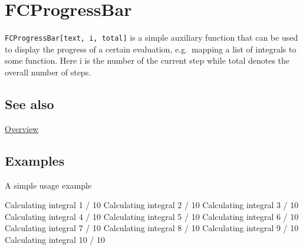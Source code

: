 \documentclass[../FeynCalcManual.tex]{subfiles}
\begin{document}
\hypertarget{fcprogressbar}{%
\section{FCProgressBar}\label{fcprogressbar}}

\texttt{FCProgressBar[\allowbreak{}text,\ \allowbreak{}i,\ \allowbreak{}total]}
is a simple auxiliary function that can be used to display the progress
of a certain evaluation, e.g.~mapping a list of integrals to some
function. Here i is the number of the current step while total denotes
the overall number of steps.

\subsection{See also}

\hyperlink{toc}{Overview}

\subsection{Examples}

A simple usage example

\begin{Shaded}
\begin{Highlighting}[]
\OperatorTok{[}\OperatorTok{[}\OperatorTok{,} \OperatorTok{,} \OperatorTok{],} \OperatorTok{\{}\OperatorTok{,} \OperatorTok{,} \OperatorTok{\}]}\NormalTok{;}
\end{Highlighting}
\end{Shaded}

Calculating integral 1 / 10 Calculating integral 2 / 10 Calculating
integral 3 / 10 Calculating integral 4 / 10 Calculating integral 5 / 10
Calculating integral 6 / 10 Calculating integral 7 / 10 Calculating
integral 8 / 10 Calculating integral 9 / 10 Calculating integral 10 / 10
\end{document}
